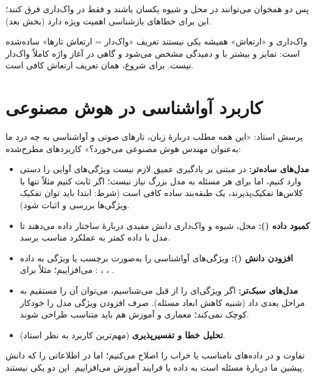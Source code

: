 پس دو همخوان می‌توانند در محل و شیوه یکسان باشند و فقط در واک‌داری فرق کنند؛ این برای خطاهای بازشناسی اهمیت ویژه دارد (بخش بعد).

\begin{correctionbox}{واک‌داری و «ارتعاش» همیشه یکی نیستند}
تعریف «واک‌دار = ارتعاش تارها» ساده‌شده است: تمایز  و  بیشتر با  و دمیدگی مشخص می‌شود و گاهی  در آغاز واژه کاملاً واک‌دار نیست. برای شروع، همان تعریف ارتعاش کافی است.
\end{correctionbox}

\section{کاربرد آواشناسی در هوش مصنوعی}

پرسش استاد: «این همه مطلب دربارهٔ زبان، تارهای صوتی و آواشناسی به چه درد ما به‌عنوان مهندس هوش مصنوعی می‌خورد؟» کاربردهای مطرح‌شده:
\begin{itemize}
  \item \textbf{مدل‌های ساده‌تر:} در  مبتنی بر یادگیری عمیق لازم نیست ویژگی‌های آوایی را دستی وارد کنیم، اما برای هر مسئله به مدل بزرگ نیاز نیست؛ اگر ثابت کنیم مثلاً تنها با  کلاس‌ها تفکیک‌پذیرند، یک طبقه‌بند ساده کافی است (شرط: ابتدا باید توان تفکیک ویژگی‌ها بررسی و اثبات شود).
  \item \textbf{کمبود داده ():} محل، شیوه و واک‌داری دانش مفیدی دربارهٔ ساختار داده می‌دهند تا مدل با داده کمتر به عملکرد مناسب برسد.
  \item \textbf{افزودن دانش ():} ویژگی‌های آواشناسی را به‌صورت برچسب یا ویژگی به داده می‌افزاییم؛ مثلاً برای : ، ، .
  \item \textbf{مدل‌های سبک‌تر:} اگر ویژگی‌ای را از قبل می‌شناسیم، می‌توان آن را مستقیم به مراحل بعدی داد (شبیه کاهش ابعاد مسئله). صرف افزودن ویژگی مدل را خودکار کوچک نمی‌کند؛ معماری و آموزش هم باید متناسب طراحی شوند.
  \item \textbf{تحلیل خطا و تفسیرپذیری} (مهم‌ترین کاربرد به نظر استاد).
\end{itemize}

\begin{exambox}{تفاوت  و }
در  داده‌های نامناسب یا خراب را اصلاح می‌کنیم؛ اما در  اطلاعاتی را که دانش پیشین ما دربارهٔ مسئله است به داده یا فرایند آموزش می‌افزاییم. این دو یکی نیستند.
\end{exambox}


